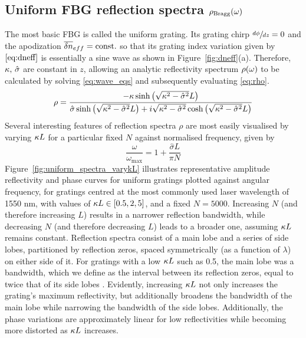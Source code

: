 \subsection*{Uniform FBG reflection spectra $\rho_\text{Bragg}(\omega)$}
\label{subsec:FBG_feedback}
%
The most basic FBG is called the uniform grating. Its grating chirp $\sfrac{d\phi}{dz} = 0$ and the apodization $\overline{\delta n}_{eff}=\text{const.}$ so that its grating index variation given by $\eqref{eq:dneff}$ is essentially a sine wave as shown in Figure~\ref{fig:dneff}(a). Therefore, $\kappa, \, \hat{\sigma}$ are constant in $z$, allowing an analytic reflectivity spectrum $\rho(\omega)$ to be calculated by solving \eqref{eq:wave_eqs} and subsequently evaluating \eqref{eq:rho}.
%
\begin{equation}
\label{eq:uniform_rho}
    \rho = \frac{-\kappa \sinh\left(\sqrt{\kappa^2 - \hat{\sigma}^2}L\right)}{\hat{\sigma} \sinh\left(\sqrt{\kappa^2 - \hat{\sigma}^2}L\right) + i\sqrt{\kappa^2 - \hat{\sigma}^2} \cosh\left(\sqrt{\kappa^2 - \hat{\sigma}^2}L\right)}
\end{equation}
%
Several interesting features of reflection spectra $\rho$ are most easily visualised by varying $\kappa L$ for a particular fixed $N$ against normalised frequency, given by \cite{erdogan1997fiber}
%
\begin{equation*}
    \frac{\omega}{\omega_\text{max}} = 1 + \frac{\hat{\sigma} L}{\pi N}
\end{equation*}
%
Figure~\ref{fig:uniform_spectra_varykL} illustrates representative amplitude reflectivity and phase curves for uniform gratings plotted against angular frequency, for gratings centred at the most commonly used laser wavelength of 1550 nm, with values of $\kappa L \in [0.5, 2, 5]$, and a fixed $N = 5000$. Increasing $N$ (and therefore increasing $L$) results in a narrower reflection bandwidth, while decreasing $N$ (and therefore decreasing $L$) leads to a broader one, assuming $\kappa L$ remains constant. Reflection spectra consist of a main lobe and a series of side lobes, partitioned by reflection zeros, spaced symmetrically (as a function of $\lambda$) on either side of it. For gratings with a low $\kappa L$ such as 0.5, the main lobe was a bandwidth, which we define as the interval between its reflection zeros, equal to twice that of its side lobes \cite{erdogan1997fiber}. Evidently, increasing $\kappa L$ not only increases the grating's maximum reflectivity, but additionally broadens the bandwidth of the main lobe while narrowing the bandwidth of the side lobes. Additionally, the phase variations are approximately linear for low reflectivities while becoming more distorted as $\kappa L$ increases.
